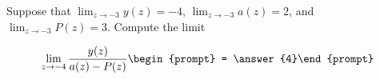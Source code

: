 \documentclass{ximera}
\author{Matthew Carr}
\begin{document}
\begin{exercise}
Suppose that $\lim_{z\to-3}y(z)=-4$, $\lim_{z\to-3}a(z)=2$, and $\lim_{z\to-3}P(z)=3$. Compute the limit

\[
\lim_{z\to -4 } \frac{y(z)}{a(z)-P(z)}\begin{prompt} = \answer{4}\end{prompt}
\]
\end{exercise}
\end{document}
